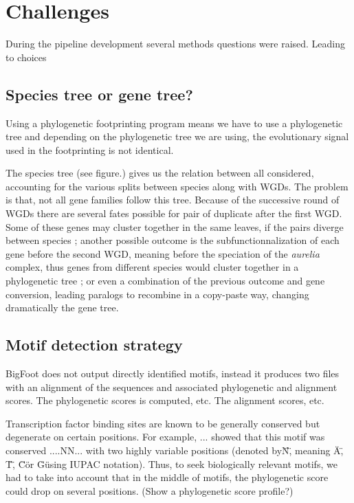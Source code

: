 \section*{Challenges}

During the pipeline development several methods questions were raised. Leading to choices

\subsection*{Species tree or gene tree?}

Using a phylogenetic footprinting program means we have to use a phylogenetic tree and depending on the phylogenetic tree we are using, the evolutionary signal used in the footprinting is not identical.

The species tree (see figure.) gives us the relation between all considered, accounting for the various splits between species along with WGDs. The problem is that, not all gene families follow this tree. Because of the successive round of WGDs there are several fates possible for pair of duplicate after the first WGD. Some of these genes may cluster together in the same leaves, if the pairs diverge between species ; another possible outcome is the subfunctionnalization of each gene before the second WGD, meaning before the speciation of the \textit{aurelia} complex, thus genes from different species would cluster together in a phylogenetic tree ; or even a combination of the previous outcome and gene conversion, leading paralogs to recombine in a copy-paste way, changing dramatically the gene tree.


\subsection*{Motif detection strategy}


BigFoot does not output directly identified motifs, instead it produces two files with an alignment of the sequences and associated phylogenetic and alignment scores. The phylogenetic scores is computed, etc. The alignment scores, etc.

Transcription factor binding sites are known to be generally conserved but degenerate on certain positions. For example, ... showed that this motif was conserved ....NN... with two highly variable positions (denoted by\"N\", meaning \"A\", \"T\", \"C\" or \"G\" using IUPAC notation). Thus, to seek biologically relevant motifs, we had to take into account that in the middle of motifs, the phylogenetic score could drop on several positions. (Show a phylogenetic score profile?)

